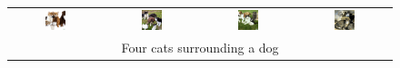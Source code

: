 \begin{figure}[ht!]
\begin{tabular}{cccc}
        \includegraphics[width=0.24\textwidth]{figures/scaling_comparison/surrounding_0.jpg} &
        \includegraphics[width=0.24\textwidth]{figures/scaling_comparison/surrounding_1.jpg} &
        \includegraphics[width=0.24\textwidth]{figures/scaling_comparison/surrounding_2.jpg} &
        \includegraphics[width=0.24\textwidth]{figures/scaling_comparison/surrounding_3.jpg}\vspace{1mm} \\
        \multicolumn{4}{c}{\small Four cats surrounding a dog}\vspace{3mm}\\


\end{tabular}
\end{figure}
